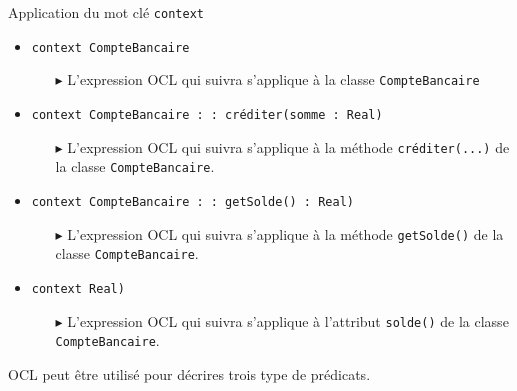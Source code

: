 \documentclass[16pt]{report}
\begin{document}
\begin{multicols*}{2}
        \begin{EExample}{Application du mot clé \texttt{context}  }{}
            \begin{itemize}
                \item \texttt{\textcolor{myb}{context} CompteBancaire} 
                    \begin{itemize}
                        \item[$\blacktriangleright$] L'expression OCL qui suivra s'applique à la classe 
                            \texttt{CompteBancaire}  
                    \end{itemize}
                \item \texttt{\textcolor{myb}{context} CompteBancaire \textcolor{myb}{: :} créditer(somme : \textcolor{myb}{Real})}  
                    \begin{itemize} 
                        \item[$\blacktriangleright$] L'expression OCL qui suivra s'applique à la méthode 
                        \texttt{créditer(...)} de la classe \texttt{CompteBancaire}.     
                    \end{itemize}
                \item \texttt{\textcolor{myb}{context} CompteBancaire \textcolor{myb}{: :} getSolde() \textcolor{myb}{: Real})}
                    \begin{itemize} 
                        \item[$\blacktriangleright$] L'expression OCL qui suivra s'applique à la méthode 
                        \texttt{getSolde()} de la classe \texttt{CompteBancaire}.     
                    \end{itemize}
                \item \texttt{\textcolor{myb}{context} \color{myb}{solde :} \textcolor{myb}{Real})}
                    \begin{itemize} 
                        \item[$\blacktriangleright$] L'expression OCL qui suivra s'applique à l'attribut 
                            \texttt{solde()} de la classe \texttt{CompteBancaire}.     
                    \end{itemize}
            \end{itemize}
        \end{EExample}                    


        \begin{note}{}{}
            OCL peut être utilisé pour décrires trois type de \textcolor{myb}{prédicats}.   
        \end{note} 





\end{multicols*}
\end{document}
